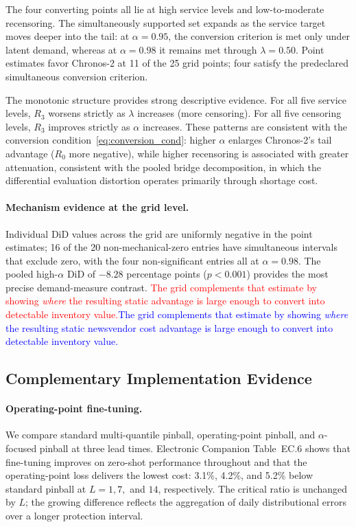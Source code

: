 \documentclass[msom,dblanonrev]{informs4}
\newcommand{\add}[1]{\textcolor{blue}{#1}}
\newcommand{\reduce}[1]{\textcolor{red}{#1}\hspace{0.5em}}
\begin{document}
The four converting points all lie at high service levels and low-to-moderate recensoring.
The simultaneously supported set expands as the service target moves deeper into the tail: at $\alpha=0.95$, the conversion criterion is met only under latent demand, whereas at $\alpha=0.98$ it remains met through $\lambda=0.50$.
Point estimates favor Chronos-2 at 11 of the 25 grid points; four satisfy the predeclared simultaneous conversion criterion.

The monotonic structure provides strong descriptive evidence.
For all five service levels, $R_3$ worsens strictly as $\lambda$ increases (more censoring).
For all five censoring levels, $R_3$ improves strictly as $\alpha$ increases.
These patterns are consistent with the conversion condition~\eqref{eq:conversion_cond}: higher $\alpha$ enlarges Chronos-2's tail advantage ($R_0$ more negative), while higher recensoring is associated with greater attenuation, consistent with the pooled bridge decomposition, in which the differential evaluation distortion operates primarily through shortage cost.

\paragraph{Mechanism evidence at the grid level.}
Individual DiD values across the grid are uniformly negative in the point estimates; 16 of the 20 non-mechanical-zero entries have simultaneous intervals that exclude zero, with the four non-significant entries all at $\alpha=0.98$.
The pooled high-$\alpha$ DiD of $-8.28$ percentage points ($p<0.001$) provides the most precise demand-measure contrast.
\reduce{The grid complements that estimate by showing \emph{where} the resulting static advantage is large enough to convert into detectable inventory value.}\add{The grid complements that estimate by showing \emph{where} the resulting static newsvendor cost advantage is large enough to convert into detectable inventory value.}

\subsection{Complementary Implementation Evidence}

\paragraph{Operating-point fine-tuning.}\label{sec:ws3}
We compare standard multi-quantile pinball, operating-point pinball, and $\alpha$-focused pinball at three lead times.
Electronic Companion Table~EC.6 shows that fine-tuning improves on zero-shot performance throughout and that the operating-point loss delivers the lowest cost: 3.1\%, 4.2\%, and 5.2\% below standard pinball at $L=1,7,$ and $14$, respectively.
The critical ratio is unchanged by $L$; the growing difference reflects the aggregation of daily distributional errors over a longer protection interval.
\end{document}
